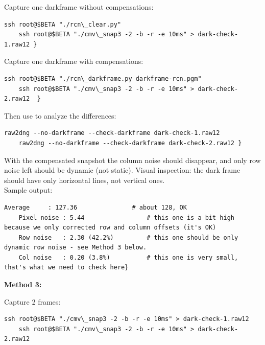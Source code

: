 {Capture one darkframe without compensations: 

\begin{lstlisting}[breaklines=true, breakatwhitespace=true]
    ssh root@$BETA "./rcn\_clear.py"
    ssh root@$BETA "./cmv\_snap3 -2 -b -r -e 10ms" > dark-check-1.raw12 }
\end{lstlisting} 

Capture one darkframe with compensations: 

\begin{lstlisting}[breaklines=true, breakatwhitespace=true]
    ssh root@$BETA "./rcn\_darkframe.py darkframe-rcn.pgm"
    ssh root@$BETA "./cmv\_snap3 -2 -b -r -e 10ms" > dark-check-2.raw12  }
\end{lstlisting} 

Then use  to analyze the differences: 

\begin{lstlisting}[breaklines=true, breakatwhitespace=true]
    raw2dng --no-darkframe --check-darkframe dark-check-1.raw12
    raw2dng --no-darkframe --check-darkframe dark-check-2.raw12 }
\end{lstlisting} 

With the compensated snapshot the column noise should disappear, and only row noise left should be dynamic (not static). Visual inspection: the dark frame should have only horizontal lines, not vertical ones.\\

Sample output: 

\begin{lstlisting}[breaklines=true, breakatwhitespace=true]
    Average     : 127.36               # about 128, OK
    Pixel noise : 5.44                 # this one is a bit high because we only corrected row and column offsets (it's OK)
    Row noise   : 2.30 (42.2%)         # this one should be only dynamic row noise - see Method 3 below.
    Col noise   : 0.20 (3.8%)          # this one is very small, that's what we need to check here}
\end{lstlisting} 


\textbf{Method 3:}

Capture 2 frames: 

\begin{lstlisting}[breaklines=true, breakatwhitespace=true]
    ssh root@$BETA "./cmv\_snap3 -2 -b -r -e 10ms" > dark-check-1.raw12 
    ssh root@$BETA "./cmv\_snap3 -2 -b -r -e 10ms" > dark-check-2.raw12 
\end{lstlisting} 

}
